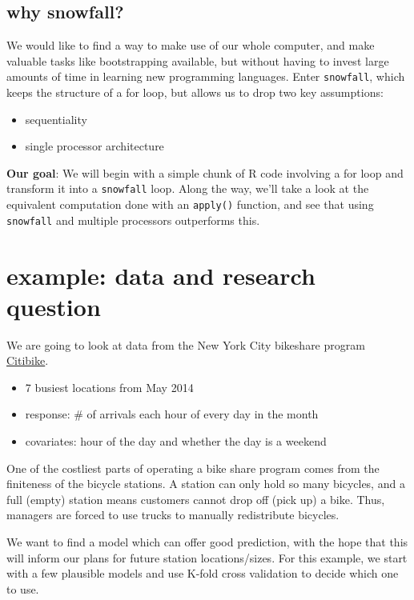 \documentclass[]{article}
\begin{document}
\subsection{why snowfall?}\label{why-snowfall}

We would like to find a way to make use of our whole computer, and make
valuable tasks like bootstrapping available, but without having to
invest large amounts of time in learning new programming languages.
Enter \texttt{snowfall}, which keeps the structure of a for loop, but
allows us to drop two key assumptions:

\begin{itemize}
\itemsep1pt\parskip0pt
\item
  sequentiality
\item
  single processor architecture
\end{itemize}

{\textbf{Our goal}}: We will begin with a simple chunk of R code
involving a for loop and transform it into a \texttt{snowfall} loop.
Along the way, we'll take a look at the equivalent computation done with
an \texttt{apply()} function, and see that using \texttt{snowfall} and
multiple processors outperforms this.

\section{example: data and research
question}\label{example-data-and-research-question}

We are going to look at data from the New York City bikeshare program
\href{https://www.citibikenyc.com/}{Citibike}.

\begin{itemize}
\itemsep1pt\parskip0pt
\item
  7 busiest locations from May 2014
\item
  response: \# of arrivals each hour of every day in the month
\item
  covariates: hour of the day and whether the day is a weekend
\end{itemize}

One of the costliest parts of operating a bike share program comes from
the finiteness of the bicycle stations. A station can only hold so many
bicycles, and a full (empty) station means customers cannot drop off
(pick up) a bike. Thus, managers are forced to use trucks to manually
redistribute bicycles.

We want to find a model which can offer good prediction, with the hope
that this will inform our plans for future station locations/sizes. For
this example, we start with a few plausible models and use K-fold cross
validation to decide which one to use.
\end{document}
